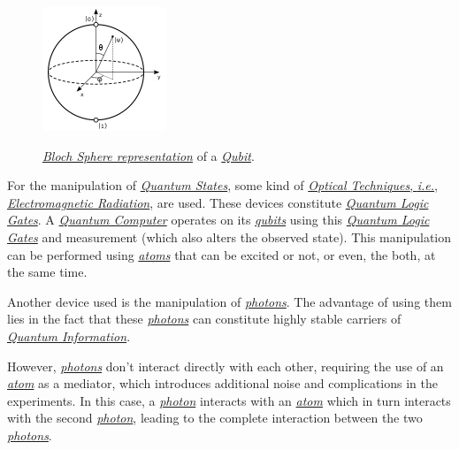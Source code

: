 \documentclass[conference]{IEEEtran}
\begin{document}
\begin{figure}[htbp]
\centerline{\href{https://en.wikipedia.org/wiki/Qubit}{\includegraphics{imgs/fig-5.png}}}
\caption{\href{https://en.wikipedia.org/wiki/Bloch_sphere}{\textit{Bloch Sphere representation}} of a \href{https://en.wikipedia.org/wiki/Qubit}{\textit{Qubit}}.}
\label{fig}
\end{figure}


\vspace{4pt}

For the manipulation of \href{https://en.wikipedia.org/wiki/Quantum_state}{\textit{Quantum States}}, some kind of \href{https://en.wikipedia.org/wiki/Electromagnetic_radiation}{\textit{Optical Techniques}, \textit{i.e.}, \textit{Electromagnetic Radiation}}, are used. These devices constitute \href{https://en.wikipedia.org/wiki/Quantum_logic_gate}{\textit{Quantum Logic Gates}}. A \href{https://en.wikipedia.org/wiki/Quantum_computing}{\textit{Quantum Computer}} operates on its \href{https://en.wikipedia.org/wiki/Qubit}{\textit{qubits}} using this \href{https://en.wikipedia.org/wiki/Quantum_logic_gate}{\textit{Quantum Logic Gates}} and measurement (which also alters the observed state). This manipulation can be performed using \href{https://en.wikipedia.org/wiki/Atom}{\textit{atoms}} that can be excited or not, or even, the both, at the same time.

\vspace{4pt}

Another device used is the manipulation of \href{https://en.wikipedia.org/wiki/Photon}{\textit{photons}}. The advantage of using them lies in the fact that these \href{https://en.wikipedia.org/wiki/Photon}{\textit{photons}} can constitute highly stable carriers of \href{https://en.wikipedia.org/wiki/Quantum_information}{\textit{Quantum Information}}.

\vspace{4pt}

However, \href{https://en.wikipedia.org/wiki/Photon}{\textit{photons}} don't interact directly with each other, requiring the use of an \href{https://en.wikipedia.org/wiki/Atom}{\textit{atom}} as a mediator, which introduces additional noise and complications in the experiments. In this case, a \href{https://en.wikipedia.org/wiki/Photon}{\textit{photon}} interacts with an \href{https://en.wikipedia.org/wiki/Atom}{\textit{atom}} which in turn interacts with the second \href{https://en.wikipedia.org/wiki/Photon}{\textit{photon}}, leading to the complete interaction between the two \href{https://en.wikipedia.org/wiki/Photon}{\textit{photons}}.
\end{document}
